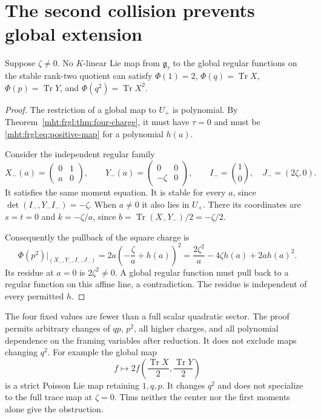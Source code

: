 \section{The second collision prevents global extension}
\label{mht:frgl:sec:second-collision}

\begin{theorem}
\label{mht:frgl:thm:global-four}
Suppose $\zeta\ne0$. No $K$-linear Lie map from $\mathfrak g_\tau$
to the global regular functions on the stable rank-two quotient can satisfy
$\Phi(1)=2$, $\Phi(q)=\operatorname{Tr}X$,
$\Phi(p)=\operatorname{Tr}Y$, and
$\Phi(q^2)=\operatorname{Tr}X^2$.
\end{theorem}

\begin{proof}
The restriction of a global map to $U_+$ is polynomial. By
Theorem~\ref{mht:frgl:thm:four-charge}, it must have $\tau=0$ and must be
\eqref{mht:frgl:eq:positive-map} for a polynomial $h(a)$.

Consider the independent regular family
\[
 X_-(a)=\begin{pmatrix}0&1\\a&0\end{pmatrix},\qquad
 Y_-(a)=\begin{pmatrix}0&0\\-\zeta&0\end{pmatrix},\qquad
 I_-=\binom10,\quad J_-=(2\zeta,0).
\]
It satisfies the same moment equation. It is stable for every $a$,
since $\det(I_-,Y_-I_-)=-\zeta$. When $a\ne0$ it also lies in
$U_+$. There its coordinates are $s=t=0$ and $k=-\zeta/a$, since
$b=\operatorname{Tr}(X_-Y_-)/2=-\zeta/2$.

Consequently the pullback of the square charge is
\[
 \Phi(p^2)|_{(X_-,Y_-,I_-,J_-)}
  =2a\left(-\frac\zeta a+h(a)\right)^2
  =\frac{2\zeta^2}{a}-4\zeta h(a)+2ah(a)^2.
\]
Its residue at $a=0$ is $2\zeta^2\ne0$. A global regular function
must pull back to a regular function on this affine line, a
contradiction. The residue is independent of every permitted $h$.
\end{proof}

The four fixed values are fewer than a full scalar quadratic sector.
The proof permits arbitrary changes of $qp$, $p^2$, all higher charges,
and all polynomial dependence on the framing variables after reduction.
It does not exclude maps changing $q^2$. For example the global map
\[
 f\longmapsto 2f\left(\frac{\operatorname{Tr}X}{2},
                       \frac{\operatorname{Tr}Y}{2}\right)
\]
is a strict Poisson Lie map retaining $1,q,p$. It changes $q^2$ and
does not specialize to the full trace map at $\zeta=0$. Thus neither
the center nor the first moments alone give the obstruction.


